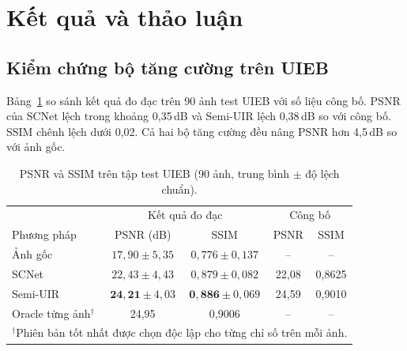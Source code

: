 \documentclass[runningheads]{llncs}
\begin{document}
\section{Kết quả và thảo luận}
\label{sec:results}

\subsection{Kiểm chứng bộ tăng cường trên UIEB}
\label{sec:res-uieb}

Bảng~\ref{tab:uieb} so sánh kết quả đo đạc trên 90 ảnh test UIEB với số liệu công bố. PSNR của SCNet lệch trong khoảng 0,35\,dB và Semi-UIR lệch 0,38\,dB so với công bố. SSIM chênh lệch dưới 0,02. Cả hai bộ tăng cường đều nâng PSNR hơn 4,5\,dB so với ảnh gốc.

\begin{table}[t]
    \centering
    \caption{PSNR và SSIM trên tập test UIEB (90 ảnh, trung bình $\pm$ độ lệch chuẩn).}
    \label{tab:uieb}
    \setlength{\tabcolsep}{4pt}
    \begin{tabular}{l c c c c}
        \toprule
                                                                   & \multicolumn{2}{c}{Kết quả đo đạc}  & \multicolumn{2}{c}{Công bố}                  \\
        Phương pháp                                                & PSNR (dB)                           & SSIM                          & PSNR  & SSIM   \\
        \midrule
        Ảnh gốc                                                    & $17{,}90 \pm 5{,}35$                & $0{,}776 \pm 0{,}137$         & --    & --     \\
        SCNet~\cite{fuUnderwaterImageEnhancement2022}              & $22{,}43 \pm 4{,}43$                & $0{,}879 \pm 0{,}082$         & 22,08 & 0,8625 \\
        Semi-UIR~\cite{huangContrastiveSemisupervisedLearning2023} & $\mathbf{24{,}21} \pm 4{,}03$       & $\mathbf{0{,}886} \pm 0{,}069$& 24,59 & 0,9010 \\
        \midrule
        Oracle từng ảnh$^{\dagger}$                                & 24,95                               & 0,9006                        & --    & --     \\
        \bottomrule
        \multicolumn{5}{l}{\footnotesize $^{\dagger}$Phiên bản tốt nhất được chọn độc lập cho từng chỉ số trên mỗi ảnh.}
    \end{tabular}
\end{table}
\end{document}
